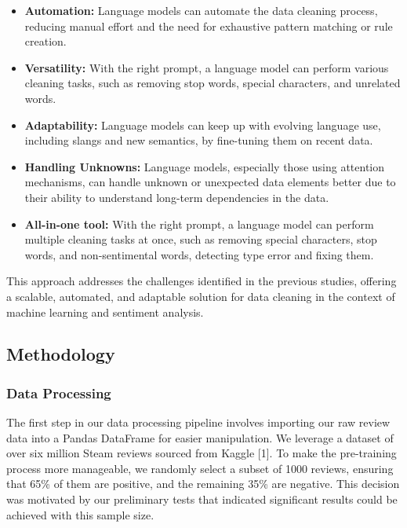 \documentclass{article}
\begin{document}
\begin{itemize}
    \item \textbf{Automation:} Language models can automate the data cleaning process, reducing manual effort and the need for exhaustive pattern matching or rule creation.
    \item \textbf{Versatility:} With the right prompt, a language model can perform various cleaning tasks, such as removing stop words, special characters, and unrelated words.
    \item \textbf{Adaptability:} Language models can keep up with evolving language use, including slangs and new semantics, by fine-tuning them on recent data.
    \item \textbf{Handling Unknowns:} Language models, especially those using attention mechanisms, can handle unknown or unexpected data elements better due to their ability to understand long-term dependencies in the data.
    \item \textbf{All-in-one tool:} With the right prompt, a language model can perform multiple cleaning tasks at once, such as removing special characters, stop words, and non-sentimental words, detecting type error and fixing them.
\end{itemize}

This approach addresses the challenges identified in the previous studies, offering a scalable, automated, and adaptable solution for data cleaning in the context of machine learning and sentiment analysis.


\subsection{Methodology}

\subsubsection{Data Processing}

The first step in our data processing pipeline involves importing our raw review data into a Pandas DataFrame for easier manipulation. We leverage a dataset of over six million Steam reviews sourced from Kaggle [1]. To make the pre-training process more manageable, we randomly select a subset of 1000 reviews, ensuring that 65\% of them are positive, and the remaining 35\% are negative. This decision was motivated by our preliminary tests that indicated significant results could be achieved with this sample size.
\end{document}
